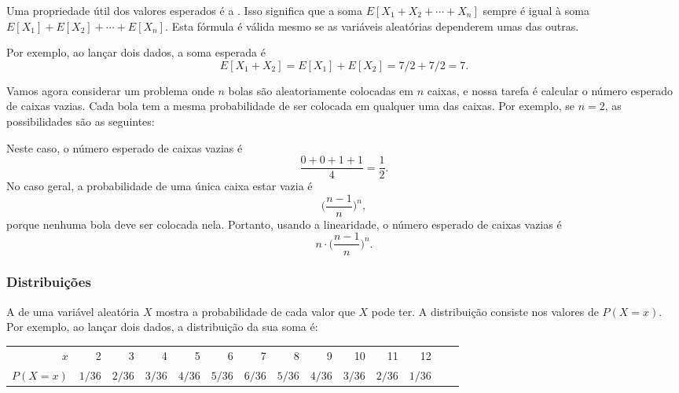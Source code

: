 Uma propriedade útil dos valores esperados é a .
Isso significa que a soma
$E[X_1+X_2+\cdots+X_n]$
sempre é igual à soma
$E[X_1]+E[X_2]+\cdots+E[X_n]$.
Esta fórmula é válida mesmo se as variáveis aleatórias
dependerem umas das outras.

Por exemplo, ao lançar dois dados,
a soma esperada é
\[E[X_1+X_2]=E[X_1]+E[X_2]=7/2+7/2=7.\]

Vamos agora considerar um problema onde
$n$ bolas são aleatoriamente colocadas em $n$ caixas,
e nossa tarefa é calcular o número esperado
de caixas vazias.
Cada bola tem a mesma probabilidade de
ser colocada em qualquer uma das caixas.
Por exemplo, se $n=2$, as possibilidades
são as seguintes:
\begin{center}
\end{center}
Neste caso, o número esperado de
caixas vazias é
\[\frac{0+0+1+1}{4} = \frac{1}{2}.\]
No caso geral, a probabilidade de uma
única caixa estar vazia é
\[\Big(\frac{n-1}{n}\Big)^n,\]
porque nenhuma bola deve ser colocada nela.
Portanto, usando a linearidade, o número esperado de
caixas vazias é
\[n \cdot \Big(\frac{n-1}{n}\Big)^n.\]

\subsubsection{Distribuições}


A  de uma variável aleatória $X$
mostra a probabilidade de cada valor que
$X$ pode ter.
A distribuição consiste nos valores de $P(X=x)$.
Por exemplo, ao lançar dois dados,
a distribuição da sua soma é:
\begin{center}
\small {
\begin{tabular}{r|rrrrrrrrrrrrr}
$x$ & 2 & 3 & 4 & 5 & 6 & 7 & 8 & 9 & 10 & 11 & 12 \\
$P(X=x)$ & $1/36$ & $2/36$ & $3/36$ & $4/36$ & $5/36$ & $6/36$ & $5/36$ & $4/36$ & $3/36$ & $2/36$ & $1/36$ \\
\end{tabular}
}
\end{center}

